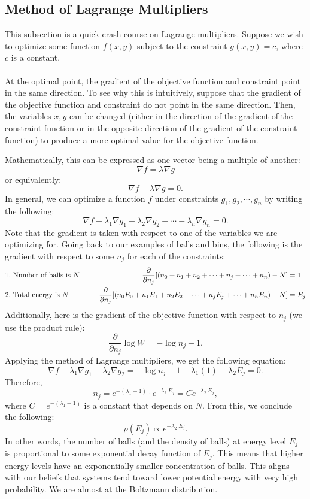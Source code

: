 \documentclass{article}
\begin{document}
\subsection{Method of Lagrange Multipliers}
This subsection is a quick crash course on Lagrange multipliers. Suppose we wish to optimize some function $f(x,y)$ subject to the constraint $g(x,y)=c$, where $c$ is a constant. 
\\
\\
At the optimal point, the gradient of the objective function and constraint point in the same direction. To see why this is intuitively, suppose that the gradient of the objective function and constraint do not point in the same direction. Then, the variables $x,y$ can be changed (either in the direction of the gradient of the constraint function or in the opposite direction of the gradient of the constraint function) to produce a more optimal value for the objective function. 

Mathematically, this can be expressed as one vector being a multiple of another:
\[\nabla f = \lambda \nabla g\]
or equivalently:
\[\nabla f - \lambda \nabla g= 0.\]
In general, we can optimize a function $f$ under constraints $g_1, g_2, \cdots, g_n$ by writing the following:
\[\nabla f - \lambda_1 \nabla g_1 - \lambda_2 \nabla g_2 - \cdots - \lambda_n \nabla g_n= 0.\]
Note that the gradient is taken with respect to one of the variables we are optimizing for. Going back to our examples of balls and bins, the following is the gradient with respect to some $n_j$ for each of the constraints:
\begin{align*}
    1.&\text{ Number of balls is }N&\hspace{6mm}\frac{\partial }{\partial n_j}[(n_0+n_1+n_2+\cdots+n_j+\cdots+n_n)-N]&=1\\
    2.&\text{ Total energy is }N&\hspace{6mm} \frac{\partial }{\partial n_j}[(n_0E_0+n_1E_1+n_2E_2+\cdots+n_jE_j+\cdots+n_nE_n)-N]&=E_j
\end{align*}
Additionally, here is the gradient of the objective function with respect to $n_j$ (we use the product rule):
\[\frac{\partial }{\partial n_j}\log W=-\log n_j-1.\]
Applying the method of Lagrange multipliers, we get the following equation:
\[\nabla f - \lambda_1 \nabla g_1 - \lambda_2 \nabla g_2 = -\log n_j-1 - \lambda_1 (1) - \lambda_2 E_j=0.\]
Therefore,
\[n_j=e^{-(\lambda_1+1)}\cdot e^{-\lambda_2\ E_j} = Ce^{-\lambda_2\ E_j},\]
where $C=e^{-(\lambda_1+1)}$ is a constant that depends on $N$. From this, we conclude the following:
\[\rho(E_j)\propto e^{-\lambda_2\ E_j}.\]
In other words, the number of balls (and the density of balls) at energy level $E_j$ is proportional to some exponential decay function of $E_j$. This means that higher energy levels have an exponentially smaller concentration of balls. This aligns with our beliefs that systems tend toward lower potential energy with very high probability. We are almost at the Boltzmann distribution. 
\end{document}
